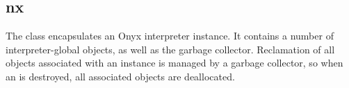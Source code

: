 %
%
%
%
%

\subsection{nx}
\label{nx}

The  class encapsulates an Onyx interpreter instance.  It contains
a number of interpreter-global objects, as well as the garbage collector.
Reclamation of all objects associated with an  instance is managed
by a garbage collector, so when an  is destroyed, all associated
objects are deallocated.

